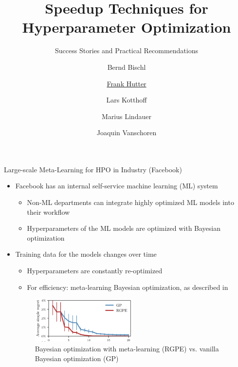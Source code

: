 

\title{Speedup Techniques for Hyperparameter Optimization}
\subtitle{Success Stories and Practical Recommendations}
\author[Frank Hutter]{Bernd Bischl \and \underline{Frank Hutter} \and Lars Kotthoff\newline \and Marius Lindauer \and Joaquin Vanschoren}
\institute{}
\date{}




\maketitle


\begin{frame}[c]{Large-scale Meta-Learning for HPO in Industry (Facebook)}

\begin{itemize}
    \item Facebook has an internal self-service machine learning (ML) system
    \begin{itemize}
    	\item Non-ML departments can integrate highly optimized ML models into their workflow
    	\item Hyperparameters of the ML models are optimized with Bayesian optimization
     \end{itemize}
\bigskip
\pause
    \item Training data for the models changes over time 
    \begin{itemize}
    	\item Hyperparameters are constantly re-optimized 
    	\item For efficiency: meta-learning Bayesian optimization, as described in 
     \end{itemize}   
\medskip
    \begin{figure}
        \centering
        \includegraphics[width=0.5\textwidth]{../w07_hpo_speedup/images/success_stories/FB_RGPE.png}
        \caption{Bayesian optimization with meta-learning (RGPE) vs. vanilla Bayesian optimization (GP)}
    \end{figure}
\end{itemize}

\end{frame}

